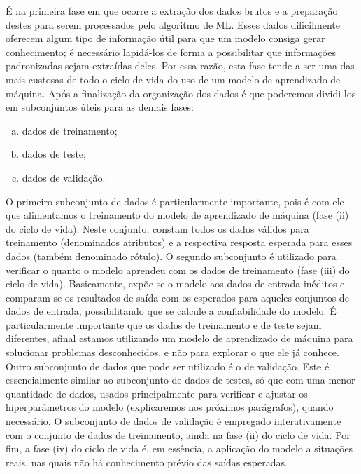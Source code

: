 É na primeira fase em que ocorre a extração dos dados brutos e a preparação destes para serem processados pelo algoritmo de ML. Esses dados dificilmente oferecem algum tipo de informação útil para que um modelo consiga gerar conhecimento; é necessário lapidá-los de forma a possibilitar que informações padronizadas sejam extraídas deles. Por essa razão, esta fase tende a ser uma das mais custosas de todo o ciclo de vida do uso de um modelo de aprendizado de máquina. Após a finalização da organização dos dados é que poderemos dividi-los em subconjuntos úteis para as demais fases: 

\begin{enumerate}[(a)]
    \item dados de treinamento;

    \item dados de teste;

    \item dados de validação.
\end{enumerate}

O primeiro subconjunto de dados é particularmente importante, pois é com ele que alimentamos o treinamento do modelo de aprendizado de máquina (fase (ii) do ciclo de vida). Neste conjunto, constam todos os dados válidos para treinamento (denominados atributos) e a respectiva resposta esperada para esses dados (também denominado rótulo). O segundo subconjunto é utilizado para verificar o quanto o modelo aprendeu com os dados de treinamento (fase (iii) do ciclo de vida). Basicamente, expõe-se o modelo aos dados de entrada inéditos e comparam-se os resultados de saída com os esperados para aqueles conjuntos de dados de entrada, possibilitando que se calcule a confiabilidade do modelo. É particularmente importante que os dados de treinamento e de teste sejam diferentes, afinal estamos utilizando um modelo de aprendizado de máquina para solucionar problemas desconhecidos, e não para explorar o que ele já conhece. Outro subconjunto de dados que pode ser utilizado é o de validação. Este é essencialmente similar ao subconjunto de dados de testes, só que com uma menor quantidade de dados, usados principalmente para verificar e ajustar os hiperparâmetros do modelo (explicaremos nos próximos parágrafos), quando necessário. O subconjunto de dados de validação é empregado interativamente com o conjunto de dados de treinamento, ainda na fase (ii) do ciclo de vida. Por fim, a fase (iv) do ciclo de vida é, em essência, a aplicação do modelo a situações reais, nas quais não há conhecimento prévio das saídas esperadas.

